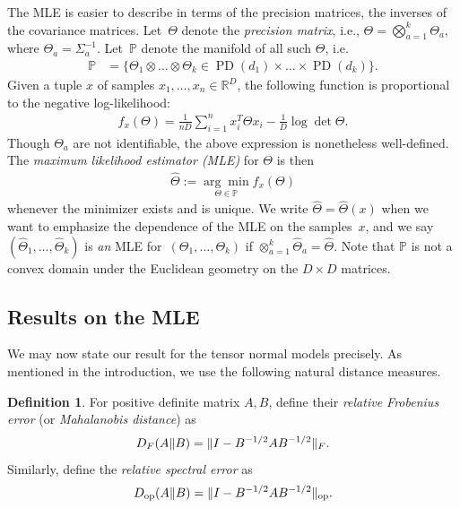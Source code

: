 \documentclass[aos]{imsart}
\theoremstyle{definition}
\newtheorem*{definition}{Definition}
\numberwithin{equation}{section}
\DeclareMathOperator{\op}{op}
\DeclareMathOperator{\PD}{PD}
\DeclarePairedDelimiter{\norm}{\lVert}{\rVert}
\newcommand{\R}{{\mathbb{R}}}
\renewcommand{\P}{{\mathbb{P}}}
\newcommand{\htheta}{\widehat{\Theta}}
\newcommand{\ot}{\otimes}
\newcommand{\samp}{x}
\newcommand{\ef}{f}
\begin{document}
The MLE is easier to describe in terms of the precision matrices, the inverses of the covariance matrices.
Let~$\Theta$ denote the \emph{precision matrix}, i.e., $\Theta = \bigotimes_{a=1}^k \Theta_a$, where $\Theta_a = \Sigma_a^{-1}$.
Let~$\P$ denote the manifold of all such $\Theta$, i.e.
\begin{align*}
  \P &= \{ \Theta_1 \ot \dots \ot \Theta_k \in \PD(d_1) \times \dots \times \PD(d_k) \}.
 \end{align*}
Given a tuple $x$ of samples $\samp_1,\dots,\samp_n\in\R^D$, the following function is proportional to the negative log-likelihood: %
\begin{align*}
  \ef_\samp(\Theta)
=  \frac{1}{nD}\sum_{i = 1}^n \samp_i^T \Theta \samp_i -  \frac{1}{D}\log\det\Theta.
\end{align*}
Though $\Theta_a$ are not identifiable, the above expression is nonetheless well-defined.
The \emph{maximum likelihood estimator (MLE)} for $\Theta$ is then
\begin{align}\label{eq:mle}
  \widehat{\Theta} := \underset{\Theta \in \P}{ \arg\min} f_x(\Theta)
\end{align}
whenever the minimizer exists and is unique.
We write $\widehat\Theta = \widehat\Theta(x)$ when we want to emphasize the dependence of the MLE on the samples~$x$, and we say $(\htheta_1, \dots, \htheta_k)$ is \emph{an} MLE for~$(\Theta_1, \dots, \Theta_k)$ if $\otimes_{a = 1}^k \htheta_a = \htheta$.
Note that $\P$ is not a convex domain under the Euclidean geometry on the $D\times D$ matrices.

\subsection{Results on the MLE}
We may now state our result for the tensor normal models precisely.
As mentioned in the introduction, we use the following natural distance measures.

\begin{definition}
For positive definite matrix $A, B$, define their \emph{relative Frobenius error} (or \emph{Mahalanobis distance}) as
\begin{align*}
  D_F(A \Vert B) = \norm{I - B^{-1/2} A B^{-1/2}}_F.
\end{align*}
Similarly, define the \emph{relative spectral error} as
\begin{align*}
  D_{\op}(A \Vert B) = \norm{I - B^{-1/2} A B^{-1/2}}_{\op}.
\end{align*}
\end{definition}
\end{document}
